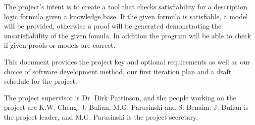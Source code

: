 The project's intent is to create a tool that checks satisfiability for a description logic formula given a knowledge base. If the given formula is satisfiable, a model will be provided, otherwise a proof will be generated demonstrating the unsatisfiability of the given fomula. In addition the program will be able to check if given proofs or models are correct.

This document provides the project key and optional requirements as well as our choice of software development method, our first iteration plan and a draft schedule for the project.

The project supervisor is Dr. Dirk Pattinson, and the people working on the project
are K.W. Cheng, J. Bulian, M.G. Parusinski and S. Benaim. J. Bulian is the project leader, and M.G. Parusinski is the project secretary.
